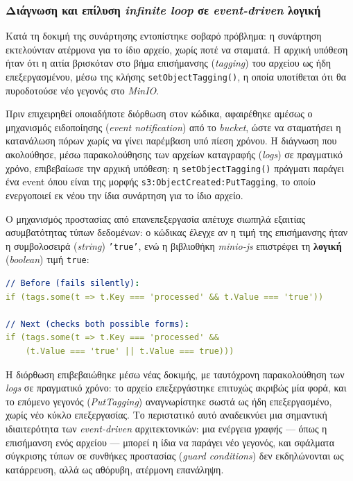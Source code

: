 \subsubsection{Διάγνωση και επίλυση \textit{infinite loop} σε \textit{event-driven} λογική}

Κατά τη δοκιμή της συνάρτησης εντοπίστηκε σοβαρό πρόβλημα: η συνάρτηση εκτελούνταν ατέρμονα για το ίδιο αρχείο, χωρίς ποτέ να σταματά. Η αρχική υπόθεση ήταν ότι η αιτία βρισκόταν στο βήμα επισήμανσης (\textit{tagging}) του αρχείου ως ήδη επεξεργασμένου, μέσω της κλήσης \texttt{setObjectTagging()}, η οποία υποτίθεται ότι θα πυροδοτούσε νέο γεγονός στο \textit{MinIO}.

Πριν επιχειρηθεί οποιαδήποτε διόρθωση στον κώδικα, αφαιρέθηκε αμέσως ο μηχανισμός ειδοποίησης (\textit{event notification}) από το \textit{bucket}, ώστε να σταματήσει η κατανάλωση πόρων χωρίς να γίνει παρέμβαση υπό πίεση χρόνου. Η διάγνωση που ακολούθησε, μέσω παρακολούθησης των αρχείων καταγραφής (\textit{logs}) σε πραγματικό χρόνο, επιβεβαίωσε την αρχική υπόθεση: η \texttt{setObjectTagging()} πράγματι παράγει ένα event όπου είναι της μορφής \texttt{s3:ObjectCreated:PutTagging}, το οποίο ενεργοποιεί εκ νέου την ίδια συνάρτηση για το ίδιο αρχείο.

Ο μηχανισμός προστασίας από επανεπεξεργασία απέτυχε σιωπηλά εξαιτίας ασυμβατότητας τύπων δεδομένων: ο κώδικας έλεγχε αν η τιμή της επισήμανσης ήταν η συμβολοσειρά (\textit{string}) \texttt{'true'}, ενώ η βιβλιοθήκη \textit{minio-js} επιστρέφει τη \textbf{λογική} (\textit{boolean}) τιμή \texttt{true}:

\begin{lstlisting}[language=yaml, caption={Διόρθωση ελέγχου tags για την αποφυγή silent failures}]
// Before (fails silently):
if (tags.some(t => t.Key === 'processed' && t.Value === 'true'))

// Next (checks both possible forms):
if (tags.some(t => t.Key === 'processed' &&
    (t.Value === 'true' || t.Value === true)))
\end{lstlisting}

\newpage
Η διόρθωση επιβεβαιώθηκε μέσω νέας δοκιμής, με ταυτόχρονη παρακολούθηση των \textit{logs} σε πραγματικό χρόνο: το αρχείο επεξεργάστηκε επιτυχώς ακριβώς μία φορά, και το επόμενο γεγονός (\textit{PutTagging}) αναγνωρίστηκε σωστά ως ήδη επεξεργασμένο, χωρίς νέο κύκλο επεξεργασίας. Το περιστατικό αυτό αναδεικνύει μια σημαντική ιδιαιτερότητα των \textit{event-driven} αρχιτεκτονικών: μια ενέργεια \textit{γραφής} --- όπως η επισήμανση ενός αρχείου --- μπορεί η ίδια να παράγει νέο γεγονός, και σφάλματα σύγκρισης τύπων σε συνθήκες προστασίας (\textit{guard conditions}) δεν εκδηλώνονται ως κατάρρευση, αλλά ως αθόρυβη, ατέρμονη επανάληψη.


